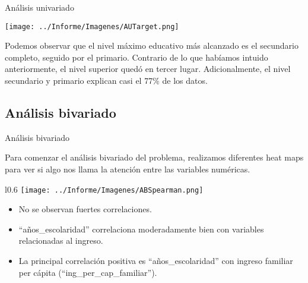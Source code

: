 \documentclass[pdf]{beamer}
\begin{document}
\begin{frame}{Análisis univariado}

    \begin{center}
        \texttt{[image: ../Informe/Imagenes/AUTarget.png]}    
    \end{center}

    Podemos observar que el nivel máximo educativo más alcanzado es el secundario completo, seguido por el primario. Contrario de lo que habíamos intuido anteriormente, el nivel superior quedó en tercer lugar. Adicionalmente, el nivel secundario y primario explican casi el 77\% de los datos.

\end{frame}
    
    \subsection{Análisis bivariado}

\begin{frame}{Análisis bivariado}
    
    Para comenzar el análisis bivariado del problema, realizamos diferentes heat maps para ver si algo nos llama la atención entre las variables numéricas.
    \begin{wrapfigure}{l}{0.6\textwidth}
        \centering
        \texttt{[image: ../Informe/Imagenes/ABSpearman.png]}
    \end{wrapfigure}
     \begin{itemize}
        \footnotesize
        \item No se observan fuertes correlaciones.
        \item ``años\_escolaridad'' correlaciona moderadamente bien con variables relacionadas al ingreso.
        \item La principal correlación positiva es ``años\_escolaridad'' con ingreso familiar per cápita (``ing\_per\_cap\_familiar'').
    \end{itemize}

\end{frame}
 

 
\end{document}
